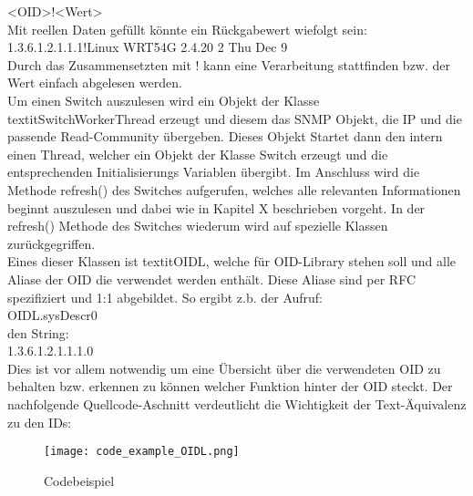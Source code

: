 <OID>!<Wert>\\

Mit reellen Daten gefüllt könnte ein Rückgabewert wiefolgt sein:\\

1.3.6.1.2.1.1.1!Linux WRT54G 2.4.20 2 Thu Dec 9\\


Durch das Zusammensetzten mit ! kann eine Verarbeitung stattfinden bzw. der Wert einfach abgelesen werden.\\
Um einen Switch auszulesen wird ein Objekt der Klasse textit{SwitchWorkerThread} erzeugt und diesem das SNMP Objekt, die IP und die passende Read-Community übergeben. Dieses Objekt Startet dann den intern einen Thread, welcher ein Objekt der Klasse Switch erzeugt und die entsprechenden Initialisierungs Variablen übergibt. Im Anschluss wird die Methode refresh() des Switches aufgerufen, welches alle relevanten Informationen beginnt auszulesen und dabei wie in Kapitel X beschrieben vorgeht. In der refresh() Methode des Switches wiederum wird auf spezielle Klassen zurückgegriffen.\\
Eines dieser Klassen ist textit{OIDL}, welche für OID-Library stehen soll und alle Aliase der OID die verwendet werden enthält. Diese Aliase sind per RFC spezifiziert und 1:1 abgebildet. So ergibt z.b. der Aufruf: \\

OIDL.sysDescr0\\

den String:\\

1.3.6.1.2.1.1.1.0\\

Dies ist vor allem notwendig um eine Übersicht über die verwendeten OID zu behalten bzw. erkennen zu können welcher Funktion hinter der OID steckt. Der nachfolgende Quellcode-Aschnitt verdeutlicht die Wichtigkeit der Text-Äquivalenz zu den IDs:\\

\begin{figure}[H]
\centering
\texttt{[image: code\_example\_OIDL.png]}
\caption{Codebeispiel}
\label{fig:classdiagramcode}
\end{figure}


